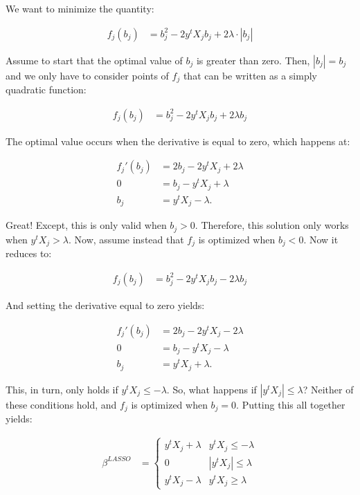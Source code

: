 \documentclass[12pt,hidelinks]{article}
\numberwithin{equation}{section}
\begin{document}
\vspace*{12pt}

We want to minimize the quantity:

\begin{align*}
f_j(b_j) &= b_j^2 - 2  y^t X_j b_j + 2 \lambda \cdot | b_j |
\end{align*}

Assume to start that the optimal value of $b_j$ is greater than zero. Then,
$| b_j | = b_j$ and we only have to consider points of $f_j$ that can be written
as a simply quadratic function:

\begin{align*}
f_j(b_j) &= b_j^2 - 2  y^t X_j b_j + 2 \lambda  b_j
\end{align*}

The optimal value occurs when the derivative is equal to zero, which happens at:

\begin{align*}
f_j'(b_j) &= 2 b_j - 2  y^t X_j + 2 \lambda \\
0 &= b_j - y^t X_j + \lambda \\
b_j &= y^t X_j - \lambda.
\end{align*}

Great! Except, this is only valid when $b_j > 0$. Therefore, this solution only
works when $y^t X_j > \lambda$. Now, assume instead that $f_j$ is optimized when
$b_j < 0$. Now it reduces to:

\begin{align*}
f_j(b_j) &= b_j^2 - 2  y^t X_j b_j - 2 \lambda  b_j
\end{align*}

And setting the derivative equal to zero yields:

\begin{align*}
f_j'(b_j) &= 2 b_j - 2  y^t X_j - 2 \lambda \\
0 &= b_j - y^t X_j - \lambda \\
b_j &= y^t X_j + \lambda.
\end{align*}

This, in turn, only holds if $y^t X_j \leq -\lambda$. So, what happens if
$|y^t X_j| \leq \lambda$? Neither of these conditions hold, and $f_j$ is optimized
when $b_j = 0$. Putting this all together yields:

\begin{align*}
\beta^{LASSO} &= \begin{cases} y^t X_j + \lambda & y^t X_j \leq -\lambda \\
                               0 & |y^t X_j| \leq \lambda \\
                               y^t X_j - \lambda & y^t X_j \geq \lambda \end{cases}
\end{align*}
\end{document}
